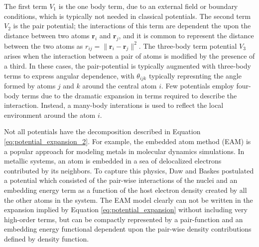 The first term $V_1$ is the one body term, due to an external field or boundary conditions, which is typically not needed in classical potentials.  The second term $V_2$ is the pair potential; the interactions of this term are dependent the upon the distance between two atoms $\bm{r}_i$ and $\bm{r}_j$, and it is common to represent the distance between the two atoms as $r_{ij}=\lVert \bm{r}_i - \bm{r}_j \rVert^2$.  The three-body term potential $V_3$ arises when the interaction between a pair of atoms is modified by the presence of a third.  In these cases, the pair-potential is typically augmented with three-body terms to express angular dependence, with $\theta_{ijk}$ typically represnting the angle formed by atoms $j$ and $k$ around the central atom $i$\cite{stillinger1985_sw}.  Few potentials employ four-body terms due to the dramatic expansion in terms required to describe the interaction.  Instead, a many-body interations is used to reflect the local environment around the atom $i$.

Not all potentials have the decomposition described in Equation \ref{eq:potential_expansion_2}.  For example, the embedded atom method (EAM)\cite{daw1984_eam} is a popular approach for modeling metals in molecular dynamics simulations.  In metallic systems, an atom is embedded in a sea of delocalized electrons contributed by its neighbors.  To capture this physics, Daw and Baskes postulated a potential which consisted of the pair-wise interactions of the nuclei and an embedding energy term as a function of the host electron density created by all the other atoms in the system.  The EAM model clearly can not be written in the expansion implied by Equation \ref{eq:potential_expansion} without including very high-order terms, but can be compactly represented by a pair-function and an embedding energy functional dependent upon the pair-wise density contributions defined by density function.

